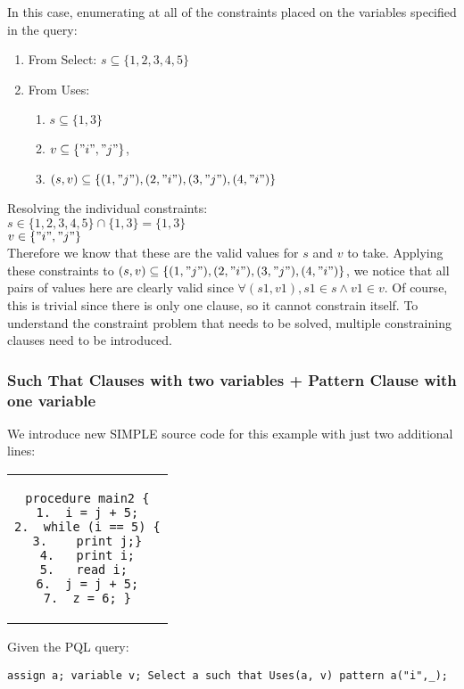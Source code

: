 \documentclass{article}
\begin{document}
In this case, enumerating at all of the constraints placed on the variables specified in the query:

\begin{enumerate}
    \item From Select: $s \subseteq \{1, 2, 3, 4, 5\}$
    \item From Uses: 
    \begin{enumerate}
        \item $s \subseteq \{1, 3\}$
        \item $v \subseteq \{"i", "j"\}$, 
        \item $(s, v) \subseteq \{(1, "j"), (2, "i"), (3, "j"), (4, "i")\}$
    \end{enumerate}
\end{enumerate}

Resolving the individual constraints: \\
$s \in  \{1, 2, 3, 4, 5\} \cap \{1, 3\} = \{1, 3\}$ \\
$v \in \{"i", "j"\}$ \\

Therefore we know that these are the valid values for $s$ and $v$ to take. Applying these constraints to  $(s, v) \subseteq \{(1, "j"), (2, "i"), (3, "j"), (4, "i")\}$, we notice that all pairs of values here are clearly valid since $\forall (s1, v1), s1 \in s \land v1 \in v$. Of course, this is trivial since there is only one clause, so it cannot constrain itself. To understand the constraint problem that needs to be solved, multiple constraining clauses need to be introduced. 

\newpage

\subsubsection{Such That Clauses with two variables + Pattern Clause with one variable}
We introduce new SIMPLE source code for this example with just two additional lines: 

\begin{center}
\begin{tabular}{c}
\begin{lstlisting}
procedure main2 {
1.  i = j + 5;
2.  while (i == 5) {
3.    print j;}
4.   print i;
5.   read i; 
6.  j = j + 5;
7.  z = 6; }
\end{lstlisting}
\end{tabular}
\end{center}

Given the PQL query: 
\begin{center}
\texttt{assign a; variable v; Select a such that Uses(a, v) pattern a("i",\_);}
\end{center}
\end{document}
